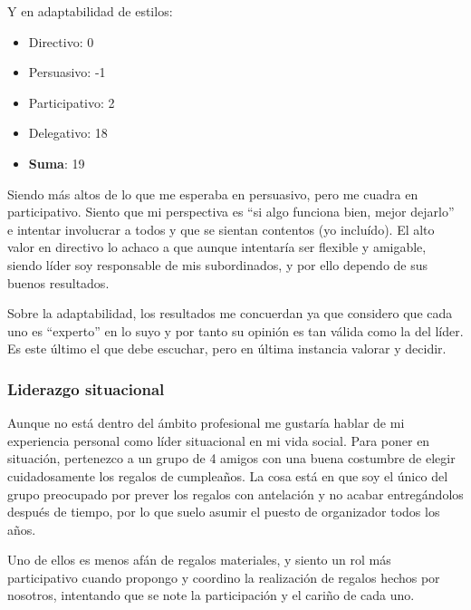 Y en adaptabilidad de estilos:
\begin{itemize}
    \item Directivo: 0
    \item Persuasivo: -1
    \item Participativo: 2
    \item Delegativo: 18
    \item \textbf{Suma}: 19
\end{itemize}

Siendo más altos de lo que me esperaba en persuasivo, pero me cuadra en participativo. Siento que mi perspectiva es ``si algo funciona bien, mejor dejarlo'' e intentar involucrar a todos y que se sientan contentos (yo incluído). El alto valor en directivo lo achaco a que aunque intentaría ser flexible y amigable, siendo líder soy responsable de mis subordinados, y por ello dependo de sus buenos resultados.

Sobre la adaptabilidad, los resultados me concuerdan ya que considero que cada uno es ``experto'' en lo suyo y por tanto su opinión es tan válida como la del líder. Es este último el que debe escuchar, pero en última instancia valorar y decidir.

\subsubsection{Liderazgo situacional}


Aunque no está dentro del ámbito profesional me gustaría hablar de mi experiencia personal como líder situacional en mi vida social. 
Para poner en situación, pertenezco a un grupo de 4 amigos con una buena costumbre de elegir cuidadosamente los regalos de cumpleaños. La cosa está en que soy el único del grupo preocupado por prever los regalos con antelación y no acabar entregándolos después de tiempo, por lo que suelo asumir el puesto de organizador todos los años.

\vspace{\baselineskip}

Uno de ellos es menos afán de regalos materiales, y siento un rol más participativo cuando propongo y coordino la realización de regalos hechos por nosotros, intentando que se note la participación y el cariño de cada uno.

